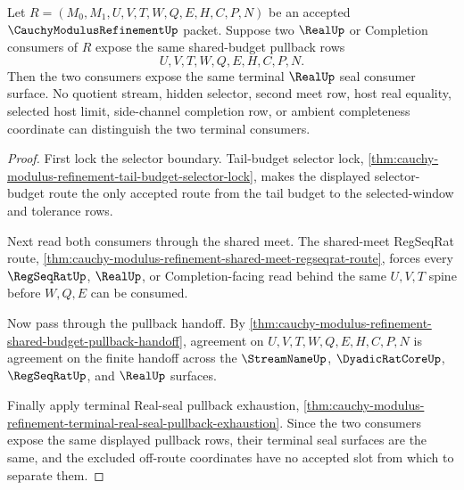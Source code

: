 \begin{theorem}
\label{thm:cauchy-modulus-refinement-terminal-pullback-consumer-uniqueness}
Let $R=(M_0,M_1,U,V,T,W,Q,E,H,C,P,N)$ be an accepted $\CauchyModulusRefinementUp$ packet. Suppose two $\RealUp$ or Completion consumers of $R$ expose the same shared-budget pullback rows
$$
U,V,T,W,Q,E,H,C,P,N.
$$
Then the two consumers expose the same terminal $\RealUp$ seal consumer surface. No quotient stream, hidden selector, second meet row, host real equality, selected host limit, side-channel completion row, or ambient completeness coordinate can distinguish the two terminal consumers.
\end{theorem}
\begin{proof}
First lock the selector boundary. Tail-budget selector lock, \autoref{thm:cauchy-modulus-refinement-tail-budget-selector-lock}, makes the displayed selector-budget route the only accepted route from the tail budget to the selected-window and tolerance rows.

Next read both consumers through the shared meet. The shared-meet RegSeqRat route, \autoref{thm:cauchy-modulus-refinement-shared-meet-regseqrat-route}, forces every $\RegSeqRatUp$, $\RealUp$, or Completion-facing read behind the same $U,V,T$ spine before $W,Q,E$ can be consumed.

Now pass through the pullback handoff. By \autoref{thm:cauchy-modulus-refinement-shared-budget-pullback-handoff}, agreement on $U,V,T,W,Q,E,H,C,P,N$ is agreement on the finite handoff across the $\StreamNameUp$, $\DyadicRatCoreUp$, $\RegSeqRatUp$, and $\RealUp$ surfaces.

Finally apply terminal Real-seal pullback exhaustion, \autoref{thm:cauchy-modulus-refinement-terminal-real-seal-pullback-exhaustion}. Since the two consumers expose the same displayed pullback rows, their terminal seal surfaces are the same, and the excluded off-route coordinates have no accepted slot from which to separate them.
\end{proof}

